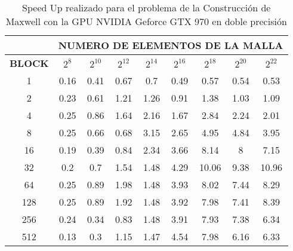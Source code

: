 \begin{table}[]
    \begin{tabular}{|c|c|c|c|c|c|c|c|c|}
    \hline
                   & \multicolumn{8}{c|}{\textbf{NUMERO DE ELEMENTOS DE LA MALLA}} \\ \hline
    \textbf{BLOCK} & $2^8$ & $2^10$& $2^12$& $2^14$& $2^16$& $2^18$& $2^20$& $2^22$\\ \hline
    1              & 0.16  & 0.41  & 0.67  & 0.7   & 0.49  & 0.57  & 0.54  & 0.53  \\ \hline
    2              & 0.23  & 0.61  & 1.21  & 1.26  & 0.91  & 1.38  & 1.03  & 1.09  \\ \hline
    4              & 0.25  & 0.86  & 1.64  & 2.16  & 1.67  & 2.84  & 2.24  & 2.01  \\ \hline
    8              & 0.25  & 0.66  & 0.68  & 3.15  & 2.65  & 4.95  & 4.84  & 3.95  \\ \hline
    16             & 0.19  & 0.39  & 0.84  & 2.34  & 3.66  & 8.14  & 8     & 7.15  \\ \hline
    32             & 0.2   & 0.7   & 1.54  & 1.48  & 4.29  & 10.06 & 9.38  & 10.96 \\ \hline
    64             & 0.25  & 0.89  & 1.98  & 1.48  & 3.93  & 8.02  & 7.44  & 8.29  \\ \hline
    128            & 0.25  & 0.89  & 1.92  & 1.48  & 3.92  & 7.98  & 7.41  & 8.39  \\ \hline
    256            & 0.24  & 0.34  & 0.83  & 1.48  & 3.91  & 7.93  & 7.38  & 6.34  \\ \hline
    512            & 0.13  & 0.3   & 1.15  & 1.47  & 4.54  & 7.98  & 6.16  & 6.33  \\ \hline
    \end{tabular}
    \caption{Speed Up realizado para el problema de la Construcción de Maxwell con la GPU NVIDIA Geforce GTX 970 en doble precisión}
    \label{tab:s_970_MxC_double_10}
    \end{table}